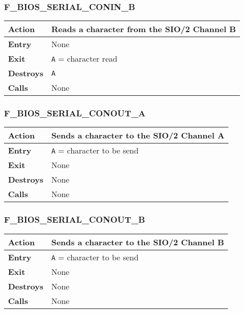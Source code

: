         \subsubsection{F\_BIOS\_SERIAL\_CONIN\_B}
        \label{func:fbiosserialconinb}
        \begin{tabular}{l p{15cm}}
            \hline\textbf{Action}
            & Reads a character from the \textbf{SIO/2} Channel B \\
            \hline\textbf{Entry} & None \\
            \hline\textbf{Exit} & \texttt{A} = character read \\
            \hline\textbf{Destroys} & \texttt{A} \\
            \hline\textbf{Calls} & None \\
            \hline
        \end{tabular}

        \subsubsection{F\_BIOS\_SERIAL\_CONOUT\_A}
        \label{func:fbiosserialconouta}
        \begin{tabular}{l p{15cm}}
            \hline\textbf{Action}
            & Sends a character to the \textbf{SIO/2} Channel A \\
            \hline\textbf{Entry} & \texttt{A} = character to be send \\
            \hline\textbf{Exit} & None \\
            \hline\textbf{Destroys} & None \\
            \hline\textbf{Calls} & None \\
            \hline
        \end{tabular}

        \subsubsection{F\_BIOS\_SERIAL\_CONOUT\_B}
        \label{func:fbiosserialconoutb}
        \begin{tabular}{l p{15cm}}
            \hline\textbf{Action}
            & Sends a character to the \textbf{SIO/2} Channel B \\
            \hline\textbf{Entry} & \texttt{A} = character to be send \\
            \hline\textbf{Exit} & None \\
            \hline\textbf{Destroys} & None \\
            \hline\textbf{Calls} & None \\
            \hline
        \end{tabular}